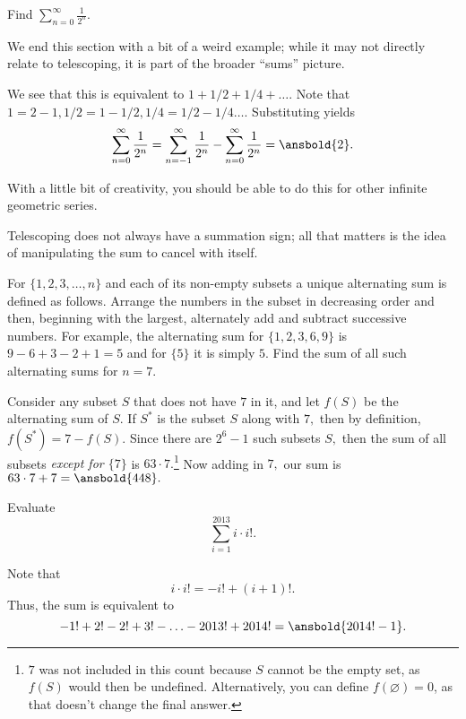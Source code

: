 \documentclass[mast]{lucky}
\begin{document}
\begin{exam}
Find $\sum\limits_{n=0}^{\infty} \frac{1}{2^n}.$
\end{exam}

We end this section with a bit of a weird example; while it may not directly relate to telescoping, it is part of the broader ``sums'' picture.

\begin{sol}
We see that this is equivalent to $1+1/2+1/4+\dots.$ Note that $1=2-1,1/2=1-1/2,1/4=1/2-1/4\dots.$ Substituting yields \[\sum\limits_{n=0}^{\infty}\frac{1}{2^n}=\sum\limits_{n=-1}^{\infty} \frac{1}{2^n}-\sum\limits_{n=0}^{\infty}\frac{1}{2^n}=\ansbold{2}.\]

With a little bit of creativity, you should be able to do this for other infinite geometric series.
\end{sol}

Telescoping does not always have a summation sign; all that matters is the idea of manipulating the sum to cancel with itself.

\begin{exam}[AIME 1983/13]
For $\{1, 2, 3, \ldots, n\}$ and each of its non-empty subsets a unique alternating sum is defined as follows. Arrange the numbers in the subset in decreasing order and then, beginning with the largest, alternately add and subtract successive numbers. For example, the alternating sum for $\{1, 2, 3, 6,9\}$ is $9-6+3-2+1=5$ and for $\{5\}$ it is simply $5$. Find the sum of all such alternating sums for $n=7$. 
\end{exam}

\begin{sol}
Consider any subset $S$ that does not have $7$ in it, and let $f(S)$ be the alternating sum of $S$. If $S^{*}$ is the subset $S$ along with $7,$ then by definition, $f(S^*)=7-f(S).$ Since there are $2^6-1$ such subsets $S,$ then the sum of all subsets \emph{except for $\{7\}$} is $63\cdot 7.$\footnote{$7$ was not included in this count because $S$ cannot be the empty set, as $f(S)$ would then be undefined. Alternatively, you can define $f(\varnothing)=0$, as that doesn't change the final answer.} Now adding in $7,$ our sum is $63\cdot 7+7=\ansbold{448}.$
\end{sol}

\begin{exam}[LMT 2014/I15]
Evaluate
\[\sum_{i=1}^{2013} i\cdot i!.\]
\end{exam}

\begin{sol}
Note that
\[i\cdot i! = -i!+(i+1)!.\]
Thus, the sum is equivalent to
\[-1!+2!-2!+3!-\ldots-2013!+2014! = \ansbold{2014!-1}.\]
\end{sol}
\end{document}
